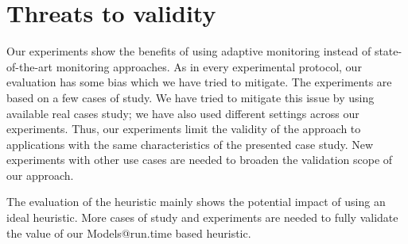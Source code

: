 


\section{Threats to validity}
Our experiments show the benefits of using adaptive monitoring instead of state-of-the-art monitoring approaches.
As in every experimental protocol, our evaluation has some bias which we have tried to mitigate.
The experiments are based on a few cases of study. 
We have tried to mitigate this issue by using available real cases study; we have also used different settings across our experiments.
Thus, our experiments limit the validity of the approach to applications with the same characteristics of the presented case study.
New experiments with other use cases are needed to broaden the validation scope of our approach.

The evaluation of the heuristic mainly shows the potential impact of using an ideal heuristic. 
More cases of study and experiments are needed to fully validate the value of our Models@run.time based heuristic.